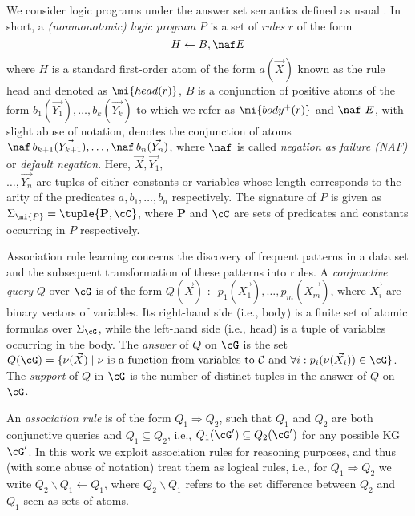 We consider logic programs under the answer set semantics defined as usual \cite{GL1988}.
In short, a \emph{(nonmonotonic) logic program} $P$ is a set of \emph{rules} $r$ of the form
\begin{equation}
H\leftarrow B, \naf E
\end{equation}
\noindent where $H$ is a standard first-order atom of the form $a(\vec{X})$ known as the rule head and denoted as $\mi{head(r)}$, $B$ is a conjunction of positive atoms of the form $b_1(\vec{Y_1}),\dotsc,b_k(\vec{Y_k})$ to which we refer as $\mi{body^+(r)}$ and $\naf\ E$, with slight abuse of notation, denotes the conjunction of atoms $\naf\, b_{k+1}(\vec{Y_{k+1}}),\dotsc,\naf\, b_n(\vec{Y_{n}})$, where $\naf$ is called \emph{negation as failure (NAF)} or \emph{default negation}.
Here, $\vec{X},\vec{Y_1},$\\$\ldots,\vec{Y_{n}}$ are tuples of either constants or
variables whose length corresponds to the arity of the predicates
$a,b_1,\ldots,b_n$ respectively. The signature of $P$ is given as $\Sigma_{\mi{P}}=\tuple{\mathbf{P},\cC}$, where $\mathbf{P}$ and $\cC$ are sets of predicates and constants occurring in $P$ respectively. %


Association rule learning concerns the discovery of frequent patterns in a data set and the subsequent transformation of these patterns into rules.
A \emph{conjunctive query} $Q$ over $\cG$ is of the form $Q(\vec{X}) \text{ :- } p_1(\vec{X_1}),\dotsc,p_m(\vec{X_m})$, where $\vec{X_i}$ are binary vectors of variables. Its  right-hand side (i.e., body) is a finite set of atomic formulas over $\Sigma_{\cG}$, while the left-hand side (i.e., head) is a tuple of variables occurring in the body. The \emph{answer} of $Q$ on $\cG$ is the set $Q(\cG) = \{ \nu(\vec{X}) \mid \nu \text{ is a function from variables to } \mathcal{C} \text{ and } \forall i: p_i(\nu(\vec{X_i})) \in \cG \}$.
The \emph{support} of
$Q$ in $\cG$ is the number of distinct tuples in the answer of $Q$ on $\cG$. 

An \emph{association rule} is of the form $Q_1 \Rightarrow  Q_2$, such that $Q_1$ and $Q_2$ are both conjunctive queries and $Q_1 \subseteq Q_2$, i.e., $Q_1(\cG')\subseteq Q_2(\cG')$ for any possible KG $\cG'$. In this work we exploit association rules for reasoning purposes, and thus (with some abuse of notation) treat them as logical rules, i.e., for $Q_1\Rightarrow Q_2$ we write $Q_2\backslash Q_1 \leftarrow Q_1$, where $Q_2 \backslash Q_1$ refers to the set difference between $Q_2$ and $Q_1$ seen as sets of atoms.

